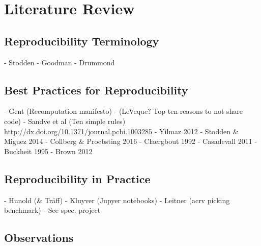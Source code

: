
\chapter{Literature Review}
\section{Reproducibility Terminology}
- Stodden
- Goodman
- Drummond
\section{Best Practices for Reproducibility}
- Gent (Recomputation manifesto)
- (LeVeque? Top ten reasons to not share code)
- Sandve et al (Ten simple rules) \url{http://dx.doi.org/10.1371/journal.pcbi.1003285}
- Yilmaz 2012
- Stodden & Miguez 2014
- Collberg & Proebsting 2016
- Claergbout 1992
- Casadevall 2011
- Buckheit 1995
- Brown 2012

\section{Reproducibility in Practice}
- Hunold (& Träff)
- Kluyver (Jupyer notebooks)
- Leitner (acrv picking benchmark)
- See spec. project
\section{Observations}

\cleardoublepage
